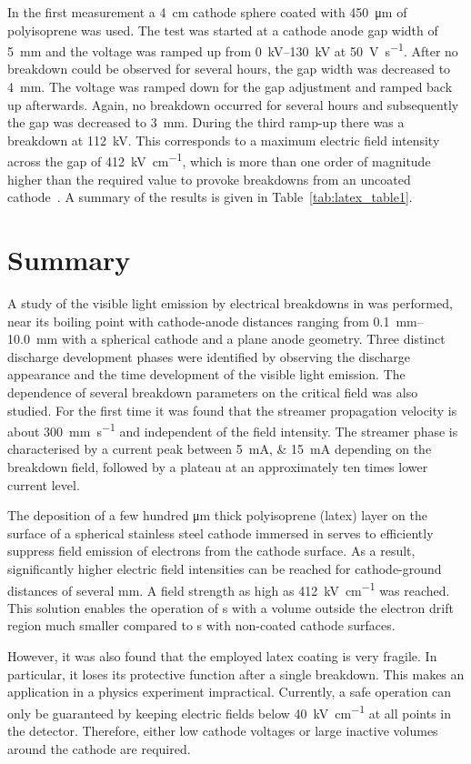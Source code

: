 In the first measurement a \SI{4}{\centi\metre} cathode sphere coated with \SI{450}{\micro\metre} of polyisoprene was used.
The test was started at a cathode anode gap width of \SI{5}{\milli\metre} and the voltage was ramped up from \SIrange{0}{130}{\kilo\volt} at \SI{50}{\volt\per\second}.
After no breakdown could be observed for several hours, the gap width was decreased to \SI{4}{\milli\metre}.
The voltage was ramped down for the gap adjustment and ramped back up afterwards.
Again, no breakdown occurred for several hours and subsequently the gap was decreased to \SI{3}{\milli\metre}.
During the third ramp-up there was a breakdown at \SI{112}{\kilo\volt}.
This corresponds to a maximum electric field intensity across the gap of \SI{412}{\kilo\volt\per\centi\metre}, which is more than one order of magnitude higher than the required value to provoke breakdowns from an uncoated cathode~\cite{breakdown_14, breakdown_16}.
A summary of the results is given in Table~\ref{tab:latex_table1}.


\section{ Summary}
\label{sec:studies_hv-summary}

A study of the visible light emission by electrical breakdowns in \lar{} was performed, near its boiling point with cathode-anode distances ranging from \SIrange{0.1}{10.0}{\milli\metre} with a spherical cathode and a plane anode geometry.
Three distinct discharge development phases were identified by observing the discharge appearance and the time development of the visible light emission.
The dependence of several breakdown parameters on the critical field was also studied.
For the first time it was found that the streamer propagation velocity is about \SI{300}{\milli\metre\per\second} and independent of the field intensity.
The streamer phase is characterised by a current peak between \SIlist{5; 15}{\milli\ampere} depending on the breakdown field, followed by a plateau at an approximately ten times lower current level.

The deposition of a few hundred \si{\micro\metre} thick polyisoprene (latex) layer on the surface of a spherical stainless steel cathode immersed in \lar{} serves to efficiently suppress field emission of electrons from the cathode surface.
As a result, significantly higher electric field intensities can be reached for cathode-ground distances of several \si{\milli\metre}.
A field strength as high as \SI{412}{\kilo\volt\per\centi\metre} was reached.
This solution enables the operation of \lartpc{}s with a \lar{} volume outside the electron drift region much smaller compared to \lartpc{}s with non-coated cathode surfaces.

However, it was also found that the employed latex coating is very fragile.
In particular, it loses its protective function after a single breakdown.
This makes an application in a physics experiment impractical.
Currently, a safe \lartpc{} operation can only be guaranteed by keeping electric fields below \SI{40}{\kilo\volt\per\centi\metre} at all points in the detector.
Therefore, either low cathode voltages or large inactive volumes around the cathode are required.